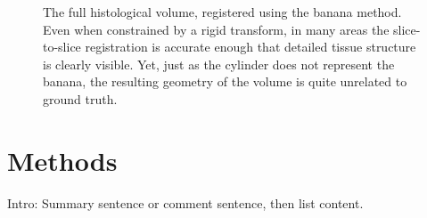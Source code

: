     \begin{figure}[htbp]
      \centering
      \caption{The full histological volume, registered using the banana method. Even when constrained by a rigid transform, in many areas the slice-to-slice registration is accurate enough that detailed tissue structure is clearly visible. Yet, just as the cylinder does not represent the banana, the resulting geometry of the volume is quite unrelated to ground truth.}
      \label{fig:banana}
    \end{figure}
    

\section{Methods} %
\label{sec:methods}
  Intro: Summary sentence or comment sentence, then list content.

